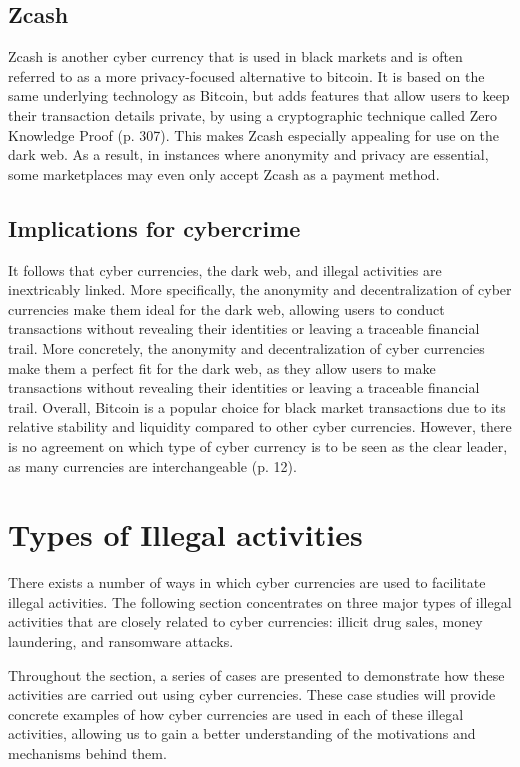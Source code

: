 \subsection*{Zcash}
Zcash is another cyber currency that is used in black markets and is often referred to as a more privacy-focused alternative to bitcoin. It is based on the same underlying technology as Bitcoin, but adds features that allow users to keep their transaction details private, by using a cryptographic technique called Zero Knowledge Proof \cite{harikrishnan_secure_2019} (p. 307). This makes Zcash especially appealing for use on the dark web. As a result, in instances where anonymity and privacy are essential, some marketplaces may even only accept Zcash as a payment method.

\subsection*{Implications for cybercrime}
It follows that cyber currencies, the dark web, and illegal activities are inextricably linked. More specifically, the anonymity and decentralization of cyber currencies make them ideal for the dark web, allowing users to conduct transactions without revealing their identities or leaving a traceable financial trail. More concretely, the anonymity and decentralization of cyber currencies make them a perfect fit for the dark web, as they allow users to make transactions without revealing their identities or leaving a traceable financial trail. Overall, Bitcoin is a popular choice for black market transactions due to its relative stability and liquidity compared to other cyber currencies. However, there is no agreement on which type of cyber currency is to be seen as the clear leader, as many currencies are interchangeable \cite{ablon_markets_2014} (p. 12).

\section{Types of Illegal activities}
There exists a number of ways in which cyber currencies are used to facilitate illegal activities. The following section concentrates on three major types of illegal activities that are closely related to cyber currencies: illicit drug sales, money laundering, and ransomware attacks. 

Throughout the section, a series of cases are presented to demonstrate how these activities are carried out using cyber currencies. These case studies will provide concrete examples of how cyber currencies are used in each of these illegal activities, allowing us to gain a better understanding of the motivations and mechanisms behind them. 

